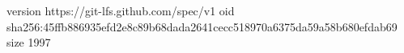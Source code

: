 version https://git-lfs.github.com/spec/v1
oid sha256:45ffb886935efd2e8c89b68dada2641cecc518970a6375da59a58b680efdab69
size 1997
